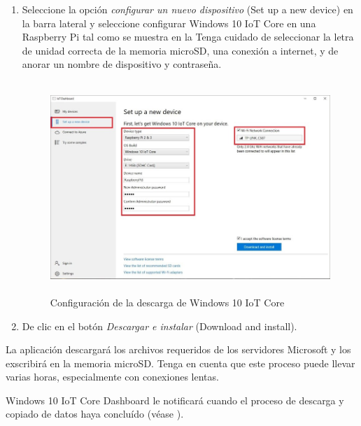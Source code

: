 \documentclass[letterpaper,10.5pt]{article}
\begin{document}
\begin{enumerate}
	\item Seleccione la opción \textit{configurar un nuevo dispositivo} (Set up a new device) en la barra lateral y seleccione configurar Windows 10 IoT Core en una Raspberry Pi tal como se muestra en la 
	Tenga cuidado de seleccionar la letra de unidad correcta de la memoria microSD, una conexión a internet, y de anorar un nombre de dispositivo y contraseña.
    \begin{figure}
		\centering%
		\includegraphics[width=0.9\columnwidth,height=8cm,keepaspectratio]{img/p02-02.jpg} %
		\caption{Configuración de la descarga de Windows 10 IoT Core}
		\label{fig:setup-new-device} %
	\end{figure}

	\item De clic en el botón \textit{Descargar e instalar} (Download and install).

\end{enumerate}

La aplicación descargará los archivos requeridos de los servidores Microsoft y los exscribirá en la memoria microSD. %
Tenga en cuenta que este proceso puede llevar varias horas, especialmente con conexiones lentas.

Windows 10 IoT Core Dashboard le notificará cuando el proceso de descarga y copiado de datos haya concluído (véase ).
\end{document}
